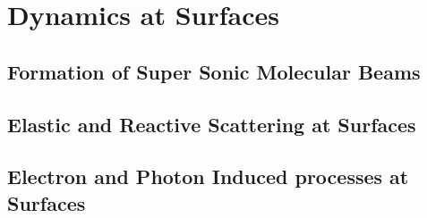 \newpage
\chapter{Dynamics at Surfaces}
\section{Formation of Super Sonic Molecular Beams}
\section{Elastic and Reactive Scattering at Surfaces}
\section{Electron and Photon Induced processes at Surfaces}